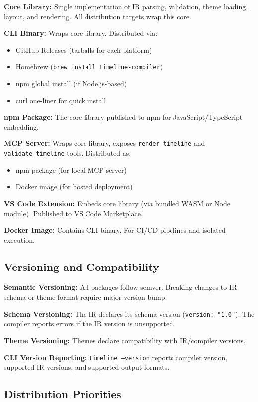 \textbf{Core Library:} Single implementation of IR parsing, validation, theme loading, layout, and rendering. All distribution targets wrap this core.

\textbf{CLI Binary:} Wraps core library. Distributed via:
\begin{itemize}
  \item GitHub Releases (tarballs for each platform)
  \item Homebrew (\texttt{brew install timeline-compiler})
  \item npm global install (if Node.js-based)
  \item curl one-liner for quick install
\end{itemize}

\textbf{npm Package:} The core library published to npm for JavaScript/TypeScript embedding.

\textbf{MCP Server:} Wraps core library, exposes \texttt{render\_timeline} and \texttt{validate\_timeline} tools. Distributed as:
\begin{itemize}
  \item npm package (for local MCP server)
  \item Docker image (for hosted deployment)
\end{itemize}

\textbf{VS Code Extension:} Embeds core library (via bundled WASM or Node module). Published to VS Code Marketplace.

\textbf{Docker Image:} Contains CLI binary. For CI/CD pipelines and isolated execution.

\subsection{Versioning and Compatibility}

\textbf{Semantic Versioning:} All packages follow semver. Breaking changes to IR schema or theme format require major version bump.

\textbf{Schema Versioning:} The IR declares its schema version (\texttt{version: "1.0"}). The compiler reports errors if the IR version is unsupported.

\textbf{Theme Versioning:} Themes declare compatibility with IR/compiler versions.

\textbf{CLI Version Reporting:} \texttt{timeline --version} reports compiler version, supported IR versions, and supported output formats.

\subsection{Distribution Priorities}

